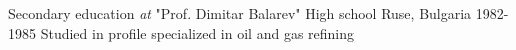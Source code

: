 \vspace{+3mm}
\cventry
{Secondary education \textit{at} "Prof. Dimitar Balarev" High school}
{Ruse, Bulgaria 1982-1985}
{
Studied in profile specialized in oil and gas refining
}
\vspace{+3mm}